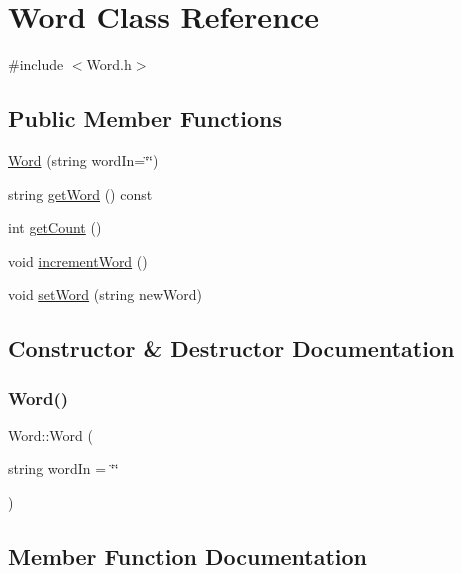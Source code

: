 \hypertarget{class_word}{}\section{Word Class Reference}
\label{class_word}


{\ttfamily \#include $<$Word.\+h$>$}

\subsection*{Public Member Functions}
\begin{DoxyCompactItemize}
\item 
\hyperlink{class_word_ae2aa5502609ee7994b6be64445dae568}{Word} (string word\+In=\char`\"{}\char`\"{})
\item 
string \hyperlink{class_word_aba41ab97af6392f3b43399d9980be9a4}{get\+Word} () const
\item 
int \hyperlink{class_word_a8126ffcad0727f409d62f5443653f445}{get\+Count} ()
\item 
void \hyperlink{class_word_adf814d3d1db1c5864462227e4f1565b6}{increment\+Word} ()
\item 
void \hyperlink{class_word_acb565f8a3aeacfb8bb9937ad570669ba}{set\+Word} (string new\+Word)
\end{DoxyCompactItemize}


\subsection{Constructor \& Destructor Documentation}
\mbox{\label{class_word_ae2aa5502609ee7994b6be64445dae568}} 
\subsubsection{\texorpdfstring{Word()}{Word()}}
{\footnotesize\ttfamily Word\+::\+Word (\begin{DoxyParamCaption}\item[{string}]{word\+In = {\ttfamily \char`\"{}\char`\"{}} }\end{DoxyParamCaption})\hspace{0.3cm}{\ttfamily [inline]}}



\subsection{Member Function Documentation}
\mbox{\label{class_word_a8126ffcad0727f409d62f5443653f445}} 
